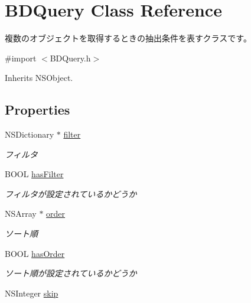 \hypertarget{interface_b_d_query}{\section{B\-D\-Query Class Reference}
\label{interface_b_d_query}
}


複数のオブジェクトを取得するときの抽出条件を表すクラスです。  




{\ttfamily \#import $<$B\-D\-Query.\-h$>$}



Inherits N\-S\-Object.

\subsection*{Properties}
\begin{DoxyCompactItemize}
\item 
N\-S\-Dictionary $\ast$ \hyperlink{interface_b_d_query_a4725c6a2f7235516b2a55f9264526c7c}{filter}
\begin{DoxyCompactList}\small\item\em フィルタ \end{DoxyCompactList}\item 
B\-O\-O\-L \hyperlink{interface_b_d_query_aff2b42885480ebf1d6311089f2be27be}{has\-Filter}
\begin{DoxyCompactList}\small\item\em フィルタが設定されているかどうか \end{DoxyCompactList}\item 
N\-S\-Array $\ast$ \hyperlink{interface_b_d_query_a6170a634653da9662cafc6fdea1b4809}{order}
\begin{DoxyCompactList}\small\item\em ソート順 \end{DoxyCompactList}\item 
B\-O\-O\-L \hyperlink{interface_b_d_query_a73fe1299cda260c7a06c941aaf0dd00c}{has\-Order}
\begin{DoxyCompactList}\small\item\em ソート順が設定されているかどうか \end{DoxyCompactList}\item 
\hypertarget{interface_b_d_query_adc131a1957691af57bf2cc34d8b96484}{N\-S\-Integer \hyperlink{interface_b_d_query_adc131a1957691af57bf2cc34d8b96484}{skip}}\label{interface_b_d_query_adc131a1957691af57bf2cc34d8b96484}


\end{DoxyCompactItemize}
